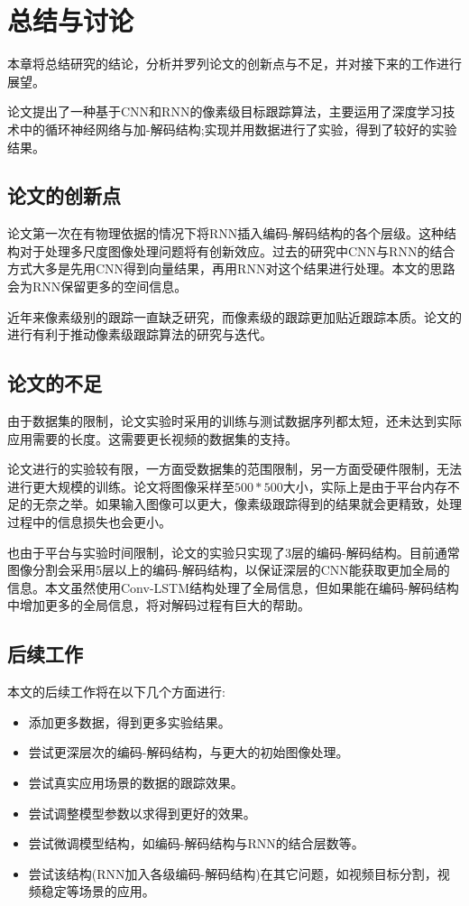 
\chapter{总结与讨论}
本章将总结研究的结论，分析并罗列论文的创新点与不足，并对接下来的工作进行展望。
\par
论文提出了一种基于CNN和RNN的像素级目标跟踪算法，主要运用了深度学习技术中的循环神经网络与加-解码结构;实现并用数据进行了实验，得到了较好的实验结果。
\section{论文的创新点}
论文第一次在有物理依据的情况下将RNN插入编码-解码结构的各个层级。这种结构对于处理多尺度图像处理问题将有创新效应。过去的研究中CNN与RNN的结合方式大多是先用CNN得到向量结果，再用RNN对这个结果进行处理。本文的思路会为RNN保留更多的空间信息。
\par
近年来像素级别的跟踪一直缺乏研究，而像素级的跟踪更加贴近跟踪本质。论文的进行有利于推动像素级跟踪算法的研究与迭代。
\section{论文的不足}
由于数据集的限制，论文实验时采用的训练与测试数据序列都太短，还未达到实际应用需要的长度。这需要更长视频的数据集的支持。
\par
论文进行的实验较有限，一方面受数据集的范围限制，另一方面受硬件限制，无法进行更大规模的训练。论文将图像采样至$500*500$大小，实际上是由于平台内存不足的无奈之举。如果输入图像可以更大，像素级跟踪得到的结果就会更精致，处理过程中的信息损失也会更小。
\par
也由于平台与实验时间限制，论文的实验只实现了3层的编码-解码结构。目前通常图像分割会采用5层以上的编码-解码结构，以保证深层的CNN能获取更加全局的信息。本文虽然使用Conv-LSTM结构处理了全局信息，但如果能在编码-解码结构中增加更多的全局信息，将对解码过程有巨大的帮助。
\section{后续工作}
本文的后续工作将在以下几个方面进行:
\begin{itemize}
    \item 添加更多数据，得到更多实验结果。
    \item 尝试更深层次的编码-解码结构，与更大的初始图像处理。
    \item 尝试真实应用场景的数据的跟踪效果。
    \item 尝试调整模型参数以求得到更好的效果。
    \item 尝试微调模型结构，如编码-解码结构与RNN的结合层数等。
    \item 尝试该结构(RNN加入各级编码-解码结构)在其它问题，如视频目标分割，视频稳定等场景的应用。
\end{itemize}

